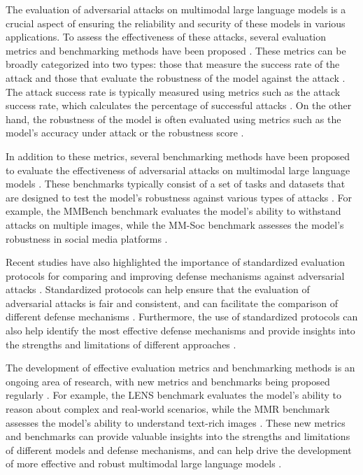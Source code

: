 \documentclass[11pt,a4paper]{article}
\begin{document}
The evaluation of adversarial attacks on multimodal large language models is a crucial aspect of ensuring the reliability and security of these models in various applications. To assess the effectiveness of these attacks, several evaluation metrics and benchmarking methods have been proposed \cite{arxiv:2408.08632}. These metrics can be broadly categorized into two types: those that measure the success rate of the attack and those that evaluate the robustness of the model against the attack \cite{arxiv:2403.20330}. The attack success rate is typically measured using metrics such as the attack success rate, which calculates the percentage of successful attacks \cite{arxiv:2407.15272}. On the other hand, the robustness of the model is often evaluated using metrics such as the model's accuracy under attack or the robustness score \cite{arxiv:2412.14660}.

In addition to these metrics, several benchmarking methods have been proposed to evaluate the effectiveness of adversarial attacks on multimodal large language models \cite{arxiv:2407.15272}. These benchmarks typically consist of a set of tasks and datasets that are designed to test the model's robustness against various types of attacks \cite{arxiv:2402.14154}. For example, the MMBench benchmark evaluates the model's ability to withstand attacks on multiple images, while the MM-Soc benchmark assesses the model's robustness in social media platforms \cite{arxiv:2408.13257}.

Recent studies have also highlighted the importance of standardized evaluation protocols for comparing and improving defense mechanisms against adversarial attacks \cite{arxiv:2409.18991}. Standardized protocols can help ensure that the evaluation of adversarial attacks is fair and consistent, and can facilitate the comparison of different defense mechanisms \cite{arxiv:2408.15769}. Furthermore, the use of standardized protocols can also help identify the most effective defense mechanisms and provide insights into the strengths and limitations of different approaches \cite{arxiv:2402.12750}.

The development of effective evaluation metrics and benchmarking methods is an ongoing area of research, with new metrics and benchmarks being proposed regularly \cite{arxiv:2505.15616}. For example, the LENS benchmark evaluates the model's ability to reason about complex and real-world scenarios, while the MMR benchmark assesses the model's ability to understand text-rich images \cite{arxiv:2502.16586}. These new metrics and benchmarks can provide valuable insights into the strengths and limitations of different models and defense mechanisms, and can help drive the development of more effective and robust multimodal large language models \cite{arxiv:2402.13607}.
\end{document}
